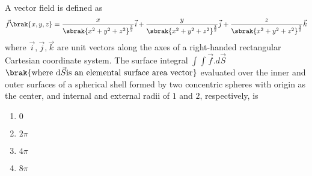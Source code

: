 \iffalse
\chapter{2020}
\author{EE24BTECH11003}
\section{me}
\fi
\item A vector field is defined as
\begin{align*}
\vec{f}\brak{x,y,z} = \frac{x}{\sbrak{x^2 + y^2 + z^2}^\frac{3}{2}}\vec{i} + \frac{y}{\sbrak{x^2 + y^2 + z^2}^\frac{3}{2}}\vec{j} + \frac{z}{\sbrak{x^2 + y^2 + z^2}^\frac{3}{2}}\vec{k}
\end{align*}
where $\vec{i}, \vec{j}, \vec{k}$ are unit vectors along the axes of a right-handed rectangular Cartesian coordinate system. The surface integral $\int\int \vec{f}.d\vec{S}$ $\brak{\text{where d}\vec{S}\text{is an elemental surface area vector}}$ evaluated over the inner and outer surfaces of a spherical shell formed by two concentric spheres with origin as the center, and internal and external radii of $1$ and $2$, respectively, is
\hfill{}
\begin{enumerate}
\item $0$
\item $2\pi$
\item $4\pi$
\item $8\pi$
\end{enumerate}

